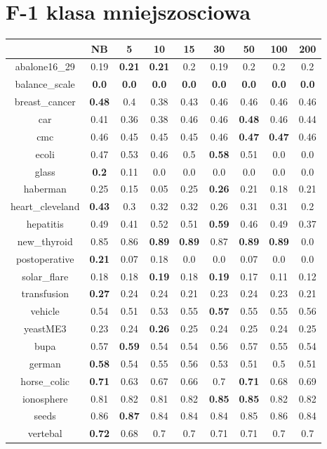 \documentclass{article}%
\begin{document}
%
\section*{F{-}1 klasa mniejszosciowa}%
\begin{tabular}{c|cccccccc}%
\hline%
&NB&5&10&15&30&50&100&200\\%
\hline%
abalone16\_29&0.19&\textbf{0.21}&\textbf{0.21}&0.2&0.19&0.2&0.2&0.2\\%
\hline%
balance\_scale&\textbf{0.0}&\textbf{0.0}&\textbf{0.0}&\textbf{0.0}&\textbf{0.0}&\textbf{0.0}&\textbf{0.0}&\textbf{0.0}\\%
\hline%
breast\_cancer&\textbf{0.48}&0.4&0.38&0.43&0.46&0.46&0.46&0.46\\%
\hline%
car&0.41&0.36&0.38&0.46&0.46&\textbf{0.48}&0.46&0.44\\%
\hline%
cmc&0.46&0.45&0.45&0.45&0.46&\textbf{0.47}&\textbf{0.47}&0.46\\%
\hline%
ecoli&0.47&0.53&0.46&0.5&\textbf{0.58}&0.51&0.0&0.0\\%
\hline%
glass&\textbf{0.2}&0.11&0.0&0.0&0.0&0.0&0.0&0.0\\%
\hline%
haberman&0.25&0.15&0.05&0.25&\textbf{0.26}&0.21&0.18&0.21\\%
\hline%
heart\_cleveland&\textbf{0.43}&0.3&0.32&0.32&0.26&0.31&0.31&0.2\\%
\hline%
hepatitis&0.49&0.41&0.52&0.51&\textbf{0.59}&0.46&0.49&0.37\\%
\hline%
new\_thyroid&0.85&0.86&\textbf{0.89}&\textbf{0.89}&0.87&\textbf{0.89}&\textbf{0.89}&0.0\\%
\hline%
postoperative&\textbf{0.21}&0.07&0.18&0.0&0.0&0.07&0.0&0.0\\%
\hline%
solar\_flare&0.18&0.18&\textbf{0.19}&0.18&\textbf{0.19}&0.17&0.11&0.12\\%
\hline%
transfusion&\textbf{0.27}&0.24&0.24&0.21&0.23&0.24&0.23&0.21\\%
\hline%
vehicle&0.54&0.51&0.53&0.55&\textbf{0.57}&0.55&0.55&0.56\\%
\hline%
yeastME3&0.23&0.24&\textbf{0.26}&0.25&0.24&0.25&0.24&0.25\\%
\hline%
bupa&0.57&\textbf{0.59}&0.54&0.54&0.56&0.57&0.55&0.54\\%
\hline%
german&\textbf{0.58}&0.54&0.55&0.56&0.53&0.51&0.5&0.51\\%
\hline%
horse\_colic&\textbf{0.71}&0.63&0.67&0.66&0.7&\textbf{0.71}&0.68&0.69\\%
\hline%
ionosphere&0.81&0.82&0.81&0.82&\textbf{0.85}&\textbf{0.85}&0.82&0.82\\%
\hline%
seeds&0.86&\textbf{0.87}&0.84&0.84&0.84&0.85&0.86&0.84\\%
\hline%
vertebal&\textbf{0.72}&0.68&0.7&0.7&0.71&0.71&0.7&0.7\\%
\hline%
\end{tabular}
\end{document}
